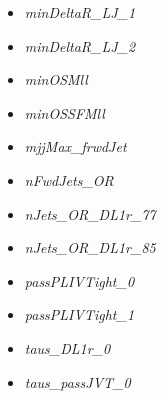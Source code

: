 \begin{multicols}{2}
\begin{itemize}
        \item \textit{minDeltaR\_LJ\_1}
        \item \textit{minDeltaR\_LJ\_2}
        \item \textit{minOSMll}
        \item \textit{minOSSFMll}
        \item \textit{mjjMax\_frwdJet}
        \item \textit{nFwdJets\_OR}
        \item \textit{nJets\_OR\_DL1r\_77}
        \item \textit{nJets\_OR\_DL1r\_85}
        \item \textit{passPLIVTight\_0}
        \item \textit{passPLIVTight\_1}
        \item \textit{taus\_DL1r\_0}
        \item \textit{taus\_passJVT\_0}
    \end{itemize}
    \end{multicols}